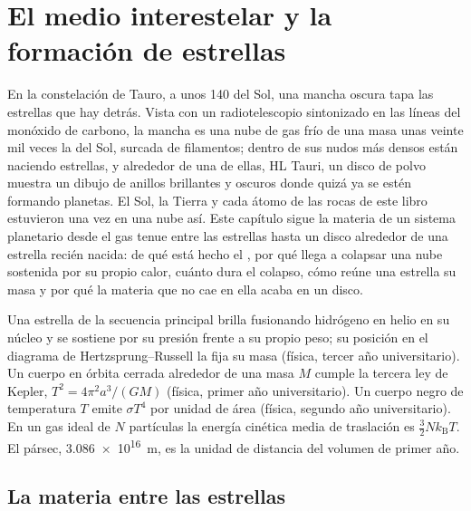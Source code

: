 \chapter{El medio interestelar y la formación de estrellas}\label{ch:b2:ism-star-formation}

En la constelación de Tauro, a unos \qty{140}{\parsec} del Sol, una mancha
oscura tapa las estrellas que hay detrás. Vista con un radiotelescopio
sintonizado en las líneas del monóxido de carbono, la mancha es una nube de gas
frío de una masa unas veinte mil veces la del Sol, surcada de filamentos;
dentro de sus nudos más densos están naciendo estrellas, y alrededor de una de
ellas, HL Tauri, un disco de polvo muestra un dibujo de anillos brillantes y
oscuros donde quizá ya se estén formando planetas. El Sol, la Tierra y cada
átomo de las rocas de este libro estuvieron una vez en una nube así. Este
capítulo sigue la materia de un sistema planetario desde el gas tenue entre las
estrellas hasta un disco alrededor de una estrella recién nacida: de qué está
hecho el , por qué llega a colapsar una nube sostenida por su propio
calor, cuánto dura el colapso, cómo reúne una estrella su masa y por qué la materia que no cae en ella acaba en un disco.

\begin{recall}
Una estrella de la secuencia principal brilla fusionando hidrógeno en helio en
su núcleo y se sostiene por su presión frente a su propio peso; su posición en
el diagrama de Hertzsprung--Russell la fija su masa (física, tercer año
universitario). Un cuerpo en órbita cerrada alrededor de una masa $M$ cumple la
tercera ley de Kepler, $T^2 = 4\pi^2 a^3/(GM)$ (física, primer año
universitario). Un cuerpo negro de temperatura $T$ emite $\sigma T^4$ por unidad
de área (física, segundo año universitario). En un gas ideal de $N$ partículas
la energía cinética media de traslación es $\tfrac32 N k_{\mathrm B} T$. El
pársec, \qty{3.086e16}{m}, es la unidad de distancia del volumen de primer año.
\end{recall}

\section{La materia entre las estrellas}

